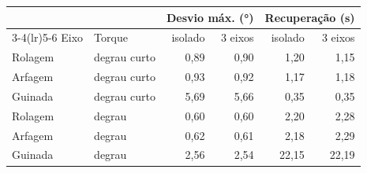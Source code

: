 \begin{tabular}{llrrrr}
\toprule
 & & \multicolumn{2}{c}{Desvio máx. (\si{\degree})} & \multicolumn{2}{c}{Recuperação (\si{\second})} \\
\cmidrule(lr){3-4}\cmidrule(lr){5-6}
Eixo & Torque & isolado & 3 eixos & isolado & 3 eixos \\
\midrule
Rolagem & degrau curto & 0,89 & 0,90 & 1,20 & 1,15 \\
Arfagem & degrau curto & 0,93 & 0,92 & 1,17 & 1,18 \\
Guinada & degrau curto & 5,69 & 5,66 & 0,35 & 0,35 \\
Rolagem & degrau & 0,60 & 0,60 & 2,20 & 2,28 \\
Arfagem & degrau & 0,62 & 0,61 & 2,18 & 2,29 \\
Guinada & degrau & 2,56 & 2,54 & 22,15 & 22,19 \\
\bottomrule
\end{tabular}
